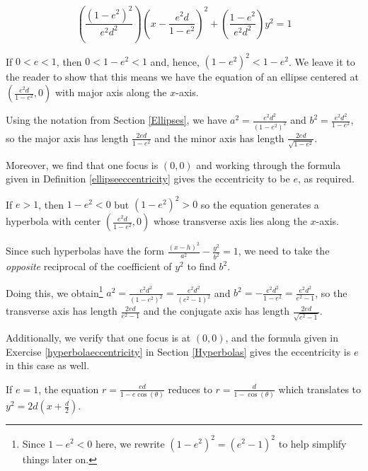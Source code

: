 \documentclass{ximera}
\begin{document}
\[ \left( \frac{\left(1-e^2\right)^2}{e^2d^2}\right) \left(x - \frac{e^2 d}{1-e^2}\right)^2 + \left(\frac{1-e^2}{e^2d^2}\right) y^2 = 1\]


If $0 < e < 1$, then $0< 1-e^2 < 1$ and, hence, $(1-e^2)^2 < 1-e^2$.  We leave it to the reader to show that this means we have  the equation of an ellipse centered at  $\left(\frac{e^2 d}{1-e^2}, 0\right)$  with major axis along the $x$-axis. 

 

Using the notation from Section \ref{Ellipses}, we have $a^2 = \frac{e^2 d^2}{\left(1-e^2\right)^2}$ and $b^2 = \frac{e^2 d^2}{1-e^2}$, so the major axis has length $\frac{2ed}{1-e^2}$ and the minor axis has length $\frac{2ed}{\sqrt{1-e^2}}$.  

 

Moreover, we find that one focus is $(0,0)$ and working through the formula given in  Definition \ref{ellipseeccentricity} gives the eccentricity to be $e$, as required. 

 

 If $e > 1$, then $1 - e^2 < 0$ but $(1-e^2)^2 > 0$ so the equation generates a hyperbola with center $\left(\frac{e^2 d}{1-e^2}, 0\right)$ whose transverse axis lies along the $x$-axis.  
 
  
 
 Since such hyperbolas have the form $\frac{(x-h)^2}{a^2} -\frac{y^2}{b^2} = 1$, we need to take the \textit{opposite} reciprocal of the coefficient of $y^2$ to find $b^2$. 
 
  
 
Doing this, we obtain\footnote{ Since $1 - e^2 < 0$ here, we rewrite $\left(1-e^2\right)^2 = \left(e^2-1\right)^2$ to help simplify things later on.}  $a^2 = \frac{e^2 d^2}{\left(1-e^2\right)^2} = \frac{e^2d^2}{\left(e^2-1\right)^2}$ and  $b^2 = -\frac{e^2 d^2}{1-e^2} = \frac{e^2d^2}{e^2-1}$, so the transverse axis has length  $\frac{2ed}{e^2-1}$ and the conjugate axis has length $\frac{2ed}{\sqrt{e^2-1}}$.  
 
  
 
 Additionally, we verify that one focus is at $(0,0)$, and the formula given in Exercise \ref{hyperbolaeccentricity} in Section \ref{Hyperbolas} gives  the eccentricity is $e$ in this case as well. 
 
  
 
 If $e=1$, the equation $r = \frac{ed}{1-e\cos(\theta)}$ reduces to $r = \frac{d}{1-\cos(\theta)}$ which translates to $y^2 = 2d\left(x + \frac{d}{2}\right)$.   
 
\end{document}
